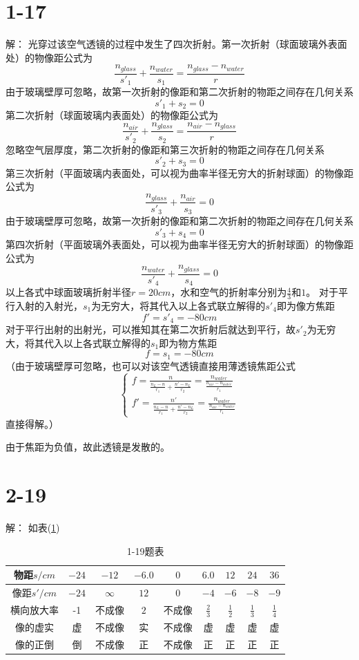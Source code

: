 \documentclass[10pt,a4paper]{article}
\theoremstyle{remark}
\begin{document}
\section*{1-17}解：
光穿过该空气透镜的过程中发生了四次折射。第一次折射（球面玻璃外表面处）的物像距公式为
\[
\frac{n_{glass}}{s'_1} + \frac{n_{water}}{s_1} = \frac{n_{glass} - n_{water}}{r}
\]
由于玻璃壁厚可忽略，故第一次折射的像距和第二次折射的物距之间存在几何关系
\[
s'_1 + s_2 = 0
\]
第二次折射（球面玻璃内表面处）的物像距公式为
\[
\frac{n_{air}}{s'_2} + \frac{n_{glass}}{s_2} = \frac{n_{air} - n_{glass}}{r}
\]
忽略空气层厚度，第二次折射的像距和第三次折射的物距之间存在几何关系
\[
s'_2 + s_3 = 0
\]
第三次折射（平面玻璃内表面处，可以视为曲率半径无穷大的折射球面）的物像距公式为
\[
\frac{n_{glass}}{s'_3} + \frac{n_{air}}{s_3} = 0
\]
由于玻璃壁厚可忽略，故第一次折射的像距和第二次折射的物距之间存在几何关系
\[
s'_3 + s_4 = 0
\]
第四次折射（平面玻璃外表面处，可以视为曲率半径无穷大的折射球面）的物像距公式为
\[
\frac{n_{water}}{s'_4} + \frac{n_{glass}}{s_4} = 0
\]
以上各式中球面玻璃折射半径$r = 20cm$，水和空气的折射率分别为$\frac{4}{3}$和$1$。
对于平行入射的入射光，$s_1$为无穷大，将其代入以上各式联立解得的$s'_4$即为像方焦距
\[
f' = s'_4 = -80cm
\]
对于平行出射的出射光，可以推知其在第二次折射后就达到平行，故$s'_2$为无穷大，将其代入以上各式联立解得的$s_1$即为物方焦距
\[
f = s_1 = -80cm
\]
（由于玻璃壁厚可忽略，也可以对该空气透镜直接用薄透镜焦距公式
\[\left\{\begin{array}{l}f = \frac{n}{\frac{n_L - n}{r_1} + \frac{n' - n_L}{r_2}} = \frac{n_{water}}{\frac{n_{air} - n_{water}}{r_1}}\\f' = \frac{n'}{\frac{n_L - n}{r_1} + \frac{n' - n_L}{r_2}} = \frac{n_{water}}{\frac{n_{air} - n_{water}}{r_1}}\end{array}\right.\]
直接得解。）

由于焦距为负值，故此透镜是发散的。
\section*{2-19}解：
如表(\ref{TableofProblem1-19})
\begin{table}[h]
\centering
\footnotesize
\begin{tabular}{| c | c | c | c | c | c | c | c | c |}
\hline
物距$s/cm$ & $-24$ & $-12$ & $-6.0$ & $0$ & $6.0$ & $12$ & $24$ & $36$ \\
\hline
像距$s'/cm$ & $-24$ & $\infty$ & $12$ & 0 & $-4$ & $-6$ & $-8$ & $-9$\\
\hline
横向放大率 & -1 & 不成像 & $2$ & 不成像 & $\frac{2}{3}$ & $\frac{1}{2}$ & $\frac{1}{3}$ & $\frac{1}{4}$\\
\hline
像的虚实 & 虚 & 不成像 & 实 & 不成像 & 虚 & 虚 & 虚 & 虚\\
\hline
像的正倒 & 倒 & 不成像 & 正 & 不成像 & 正 & 正 & 正 & 正\\
\hline
\end{tabular}
\caption{1-19题表}\label{TableofProblem1-19}
\end{table}
\end{document}
